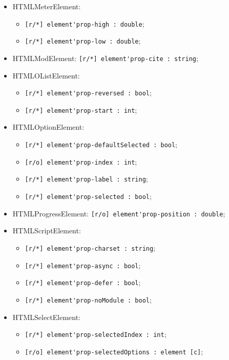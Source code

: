 \documentclass[a4paper, 14pt]{extarticle}
\newenvironment{icItems}
	{ \begin{itemize} [noitemsep,nolistsep] }
	{ \end{itemize} }
\begin{document}
\begin{icItems}
	\item HTMLMeterElement:
	\begin{icItems}
		\item \lstinline|[r/*] element'prop-high : double|;
		\item \lstinline|[r/*] element'prop-low : double|;
	\end{icItems}
	
	\item HTMLModElement: \lstinline|[r/*] element'prop-cite : string|;
	
	\item HTMLOListElement:
	\begin{icItems}
		\item \lstinline|[r/*] element'prop-reversed : bool|;
		\item \lstinline|[r/*] element'prop-start : int|;
	\end{icItems}
	
	\item HTMLOptionElement:
	\begin{icItems}
		\item \lstinline|[r/*] element'prop-defaultSelected : bool|;
		\item \lstinline|[r/o] element'prop-index : int|;
		\item \lstinline|[r/*] element'prop-label : string|;
		\item \lstinline|[r/*] element'prop-selected : bool|;
	\end{icItems}
	
	\item HTMLProgressElement: \lstinline|[r/o] element'prop-position : double|;
	
	\item HTMLScriptElement:
	\begin{icItems}
		\item \lstinline|[r/*] element'prop-charset : string|;
		\item \lstinline|[r/*] element'prop-async : bool|;
		\item \lstinline|[r/*] element'prop-defer : bool|;
		\item \lstinline|[r/*] element'prop-noModule : bool|;
	\end{icItems}
	
	\item HTMLSelectElement:
	\begin{icItems}
		\item \lstinline|[r/*] element'prop-selectedIndex : int|;
		\item \lstinline|[r/o] element'prop-selectedOptions : element [c]|;
	\end{icItems}
	

\end{icItems}
\end{document}
